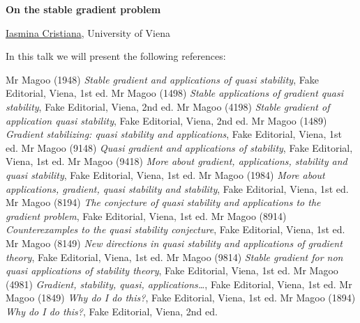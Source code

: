 \documentclass[a4paper, 11pt]{article}
\newcommand{\abstracttitle}[1]{{ \centering \LARGE \textbf{#1}\\ \vspace*{0.7cm} }}
\newcommand{\firstauthor}[2]{{ \centering \underline{#1}, \textsf{#2}\\ \vspace*{0.25cm} }}
\newcommand{\otherauthor}[2]{{ \centering #1, \textsf{#2}\\ \vspace*{0.25cm} }}
\newcommand{\abstracttext}[1]{ \vspace{0.6cm} #1 }
\begin{document}
\abstracttitle{On the stable gradient problem}

\firstauthor{Iasmina Cristiana}{University of Viena}

\abstracttext{
    In this talk we will present the following references:
}

\begin{thebibliography}{9}
Mr Magoo (1948) \emph{Stable gradient and applications of quasi stability}, Fake Editorial, Viena, 1st ed.
Mr Magoo (1498) \emph{Stable applications of gradient quasi stability}, Fake Editorial, Viena, 2nd ed.
Mr Magoo (4198) \emph{Stable gradient of application quasi stability}, Fake Editorial, Viena, 2nd ed.
Mr Magoo (1489) \emph{Gradient stabilizing: quasi stability and applications}, Fake Editorial, Viena, 1st ed.
Mr Magoo (9148) \emph{Quasi gradient and applications of stability}, Fake Editorial, Viena, 1st ed.
Mr Magoo (9418) \emph{More about gradient, applications, stability and quasi stability}, Fake Editorial, Viena, 1st ed.
Mr Magoo (1984) \emph{More about applications, gradient, quasi stability and stability}, Fake Editorial, Viena, 1st ed.
Mr Magoo (8194) \emph{The conjecture of quasi stability and applications to the gradient problem}, Fake Editorial, Viena, 1st ed.
Mr Magoo (8914) \emph{Counterexamples to the quasi stability conjecture}, Fake Editorial, Viena, 1st ed.
Mr Magoo (8149) \emph{New directions in quasi stability and applications of gradient theory}, Fake Editorial, Viena, 1st ed.
Mr Magoo (9814) \emph{Stable gradient for non quasi applications of stability theory}, Fake Editorial, Viena, 1st ed.
Mr Magoo (4981) \emph{Gradient, stability, quasi, applications\ldots}, Fake Editorial, Viena, 1st ed.
Mr Magoo (1849) \emph{Why do I do this?}, Fake Editorial, Viena, 1st ed.
Mr Magoo (1894) \emph{Why do I do this?}, Fake Editorial, Viena, 2nd ed.
\end{thebibliography}
\end{document}
